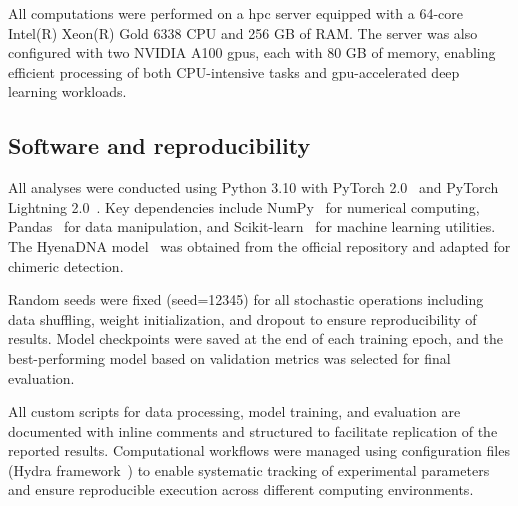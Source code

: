 \documentclass[pdflatex,sn-nature]{sn-jnl}%
\theoremstyle{thmstyleone}%
\theoremstyle{thmstyletwo}%
\theoremstyle{thmstylethree}%
\begin{document}
All computations were performed on a \gls{hpc} server equipped with a 64-core Intel(R) Xeon(R) Gold 6338 CPU and 256 GB of RAM.
The server was also configured with two NVIDIA A100 \glspl{gpu}, each with 80 GB of memory, enabling efficient processing of both CPU-intensive tasks and \gls{gpu}-accelerated deep learning workloads.

\subsection*{Software and reproducibility}

All analyses were conducted using Python 3.10 with PyTorch 2.0~\cite{paszke2019pytorch} and PyTorch Lightning 2.0~\cite{Falcon_PyTorch_Lightning_2019}.
Key dependencies include NumPy~\cite{harris2020array} for numerical computing, Pandas~\cite{mckinney2010data} for data manipulation, and Scikit-learn~\cite{pedregosa2011scikit} for machine learning utilities.
The HyenaDNA model~\cite{nguyen2023hyenadna} was obtained from the official repository and adapted for chimeric detection.

Random seeds were fixed (seed=12345) for all stochastic operations including data shuffling, weight initialization, and dropout to ensure reproducibility of results.
Model checkpoints were saved at the end of each training epoch, and the best-performing model based on validation metrics was selected for final evaluation.

All custom scripts for data processing, model training, and evaluation are documented with inline comments and structured to facilitate replication of the reported results.
Computational workflows were managed using configuration files (Hydra framework~\cite{Yadan2019Hydra}) to enable systematic tracking of experimental parameters and ensure reproducible execution across different computing environments.

\backmatter


\makeatletter
\renewcommand{\theHfigure}{extended.\thefigure}
\renewcommand{\theHtable}{extended.\thetable}
\makeatother

\renewcommand{\figurename}{Extended Data Fig.}
\renewcommand{\tablename}{Extended Data Table}
\setcounter{figure}{0}
\setcounter{table}{0}
\end{document}
